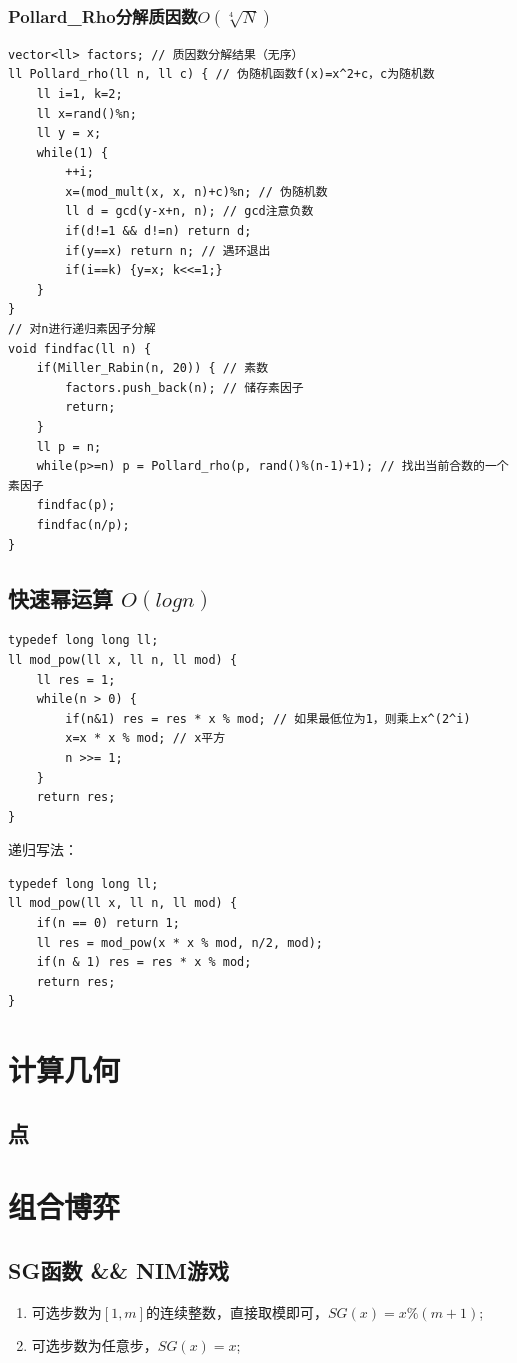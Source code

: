 \documentclass[a4paper]{ctexrep}
\begin{document}
\subsection{Pollard\_Rho分解质因数$O(\sqrt[4] N)$}
\begin{lstlisting}
vector<ll> factors; // 质因数分解结果（无序）
ll Pollard_rho(ll n, ll c) { // 伪随机函数f(x)=x^2+c，c为随机数
	ll i=1, k=2;
	ll x=rand()%n;
	ll y = x;
	while(1) {
		++i;
		x=(mod_mult(x, x, n)+c)%n; // 伪随机数
		ll d = gcd(y-x+n, n); // gcd注意负数
		if(d!=1 && d!=n) return d;
		if(y==x) return n; // 遇环退出
		if(i==k) {y=x; k<<=1;}
	}
}
// 对n进行递归素因子分解
void findfac(ll n) {
	if(Miller_Rabin(n, 20)) { // 素数
		factors.push_back(n); // 储存素因子
		return;
	}
	ll p = n;
	while(p>=n) p = Pollard_rho(p, rand()%(n-1)+1); // 找出当前合数的一个素因子
	findfac(p);
	findfac(n/p);
}
\end{lstlisting}

\section{快速幂运算 $O(log n)$}
\begin{lstlisting}
typedef long long ll;
ll mod_pow(ll x, ll n, ll mod) {
	ll res = 1;
	while(n > 0) {
		if(n&1) res = res * x % mod; // 如果最低位为1，则乘上x^(2^i)
		x=x * x % mod; // x平方
		n >>= 1;
	}
	return res;
}
\end{lstlisting}

递归写法：
\begin{lstlisting}
typedef long long ll;
ll mod_pow(ll x, ll n, ll mod) {
	if(n == 0) return 1;
	ll res = mod_pow(x * x % mod, n/2, mod);
	if(n & 1) res = res * x % mod;
	return res;
}
\end{lstlisting}

\chapter{计算几何}
\section{点}


\chapter{组合博弈}
\section{SG函数 \&\& NIM游戏}
\begin{enumerate}
	\item 可选步数为$[1, m]$的连续整数，直接取模即可，$SG(x)=x\%(m+1)$;
	\item 可选步数为任意步，$SG(x)=x$;
\end{enumerate}
\end{document}
